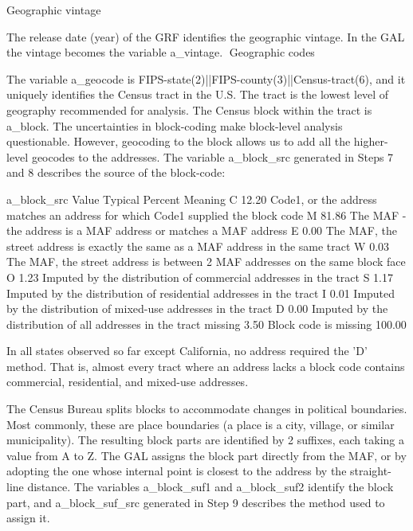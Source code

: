 Geographic vintage

The release date (year) of the GRF identifies the geographic vintage. In the GAL the vintage becomes the
variable a_vintage.
Geographic codes

The variable a_geocode is FIPS-state(2)||FIPS-county(3)||Census-tract(6), and it uniquely identifies the
Census tract in the U.S. The tract is the lowest level of geography recommended for analysis. The Census
block within the tract is a_block. The uncertainties in block-coding make block-level analysis
questionable. However, geocoding to the block allows us to add all the higher-level geocodes to the
addresses. The variable a_block_src generated in Steps 7 and 8 describes the source of the block-code:

a_block_src
Value  Typical Percent   Meaning
C              12.20          Code1, or the address matches an address for which Code1 supplied the block code
M              81.86          The MAF - the address is a MAF address or matches a MAF address
E               0.00          The MAF, the street address is exactly the same as a MAF address in the same tract
W               0.03          The MAF, the street address is between 2 MAF addresses on the same block face
O               1.23          Imputed by the distribution of commercial addresses in the tract
S               1.17          Imputed by the distribution of residential addresses in the tract
I               0.01          Imputed by the distribution of mixed-use addresses in the tract
D               0.00          Imputed by the distribution of all addresses in the tract
missing                 3.50       Block code is missing
              100.00

In all states observed so far except California, no address required the 'D' method. That is, almost every
tract where an address lacks a block code contains commercial, residential, and mixed-use addresses. 

The Census Bureau splits blocks to accommodate changes in political boundaries. Most commonly, these
are place boundaries (a place is a city, village, or similar municipality). The resulting block parts are
identified by 2 suffixes, each taking a value from A to Z. The GAL assigns the block part directly from
the MAF, or by adopting the one whose internal point is closest to the address by the straight-line
distance. The variables a_block_suf1 and a_block_suf2 identify the block part, and a_block_suf_src
generated in Step 9 describes the method used to assign it.

